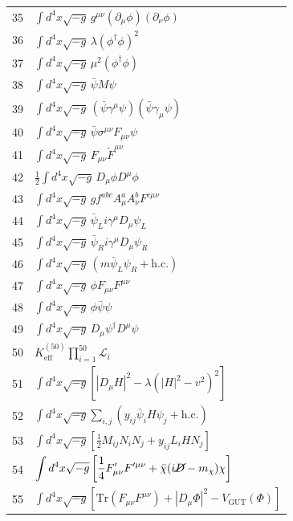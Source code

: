 \documentclass[12pt,a4paper]{article}
\begin{document}
\begin{longtable}{r p{}}
	35 & \(\displaystyle \int d^4x\sqrt{-g}\,g^{\mu\nu}(\partial_\mu\phi)(\partial_\nu\phi)\) \\
	36 & \(\displaystyle \int d^4x\sqrt{-g}\,\lambda(\phi^\dagger\phi)^2\) \\
	37 & \(\displaystyle \int d^4x\sqrt{-g}\,\mu^2(\phi^\dagger\phi)\) \\
	38 & \(\displaystyle \int d^4x\sqrt{-g}\,\bar\psi M\psi\) \\
	39 & \(\displaystyle \int d^4x\sqrt{-g}\,(\bar\psi\gamma^\mu\psi)(\bar\psi\gamma_\mu\psi)\) \\
	40 & \(\displaystyle \int d^4x\sqrt{-g}\,\bar\psi\sigma^{\mu\nu}F_{\mu\nu}\psi\) \\
	41 & \(\displaystyle \int d^4x\sqrt{-g}\,F_{\mu\nu}\tilde{F}^{\mu\nu}\) \\
	42 & \(\displaystyle \frac12\int d^4x\sqrt{-g}\,D_\mu\phi D^\mu\phi\) \\
	43 & \(\displaystyle \int d^4x\sqrt{-g}\,g f^{abc}A^a_\mu A^b_\nu F^{c\mu\nu}\) \\
	44 & \(\displaystyle \int d^4x\sqrt{-g}\,\bar\psi_L i\gamma^\mu D_\mu\psi_L\) \\
	45 & \(\displaystyle \int d^4x\sqrt{-g}\,\bar\psi_R i\gamma^\mu D_\mu\psi_R\) \\
	46 & \(\displaystyle \int d^4x\sqrt{-g}\,(m\bar\psi_L\psi_R + \text{h.c.})\) \\
	47 & \(\displaystyle \int d^4x\sqrt{-g}\,\phi F_{\mu\nu}F^{\mu\nu}\) \\
	48 & \(\displaystyle \int d^4x\sqrt{-g}\,\phi\bar\psi\psi\) \\
	49 & \(\displaystyle \int d^4x\sqrt{-g}\,D_\mu\psi^\dagger D^\mu\psi\) \\
	50 & \(\displaystyle K^{(50)}_{\mathrm{eff}}\prod_{i=1}^{50}\mathcal{L}_i\) \\
	51 & \(\displaystyle \int d^4x\sqrt{-g}\left[|D_\mu H|^2 - \lambda(|H|^2 - v^2)^2\right]\) \\
	52 & \(\displaystyle \int d^4x\sqrt{-g}\sum_{i,j}\left(y_{ij}\bar\psi_i H\psi_j + \text{h.c.}\right)\) \\
	53 & \(\displaystyle \int d^4x\sqrt{-g}\left[\frac12 M_{ij}N_i N_j + y_{ij}L_i H N_j\right]\) \\
	54 & \(\displaystyle \int d^4x\sqrt{-g}\left[\frac14 F'_{\mu\nu}F'^{\mu\nu} + \bar\chi(i\cancel{D} - m_\chi)\chi\right]\) \\
	55 & \(\displaystyle \int d^4x\sqrt{-g}\left[\mathrm{Tr}(F_{\mu\nu}F^{\mu\nu}) + |D_\mu\Phi|^2 - V_{\text{GUT}}(\Phi)\right]\) \\

\end{longtable}
\end{document}
